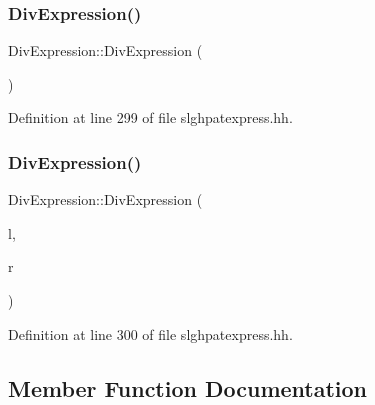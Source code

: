 \subsubsection{\texorpdfstring{DivExpression()}{DivExpression()}\hspace{0.1cm}{\footnotesize\ttfamily [1/2]}}
{\footnotesize\ttfamily Div\+Expression\+::\+Div\+Expression (\begin{DoxyParamCaption}\item[{void}]{ }\end{DoxyParamCaption})\hspace{0.3cm}{\ttfamily [inline]}}



Definition at line 299 of file slghpatexpress.\+hh.

\mbox{\label{class_div_expression_ae9bcb8749839451f7474a6f74c347271}} 
\subsubsection{\texorpdfstring{DivExpression()}{DivExpression()}\hspace{0.1cm}{\footnotesize\ttfamily [2/2]}}
{\footnotesize\ttfamily Div\+Expression\+::\+Div\+Expression (\begin{DoxyParamCaption}\item[{\mbox{\hyperlink{class_pattern_expression}{Pattern\+Expression}} $\ast$}]{l,  }\item[{\mbox{\hyperlink{class_pattern_expression}{Pattern\+Expression}} $\ast$}]{r }\end{DoxyParamCaption})\hspace{0.3cm}{\ttfamily [inline]}}



Definition at line 300 of file slghpatexpress.\+hh.



\subsection{Member Function Documentation}
\mbox{\label{class_div_expression_ae6015a985bb843e4de0debf6387d1259}} 
